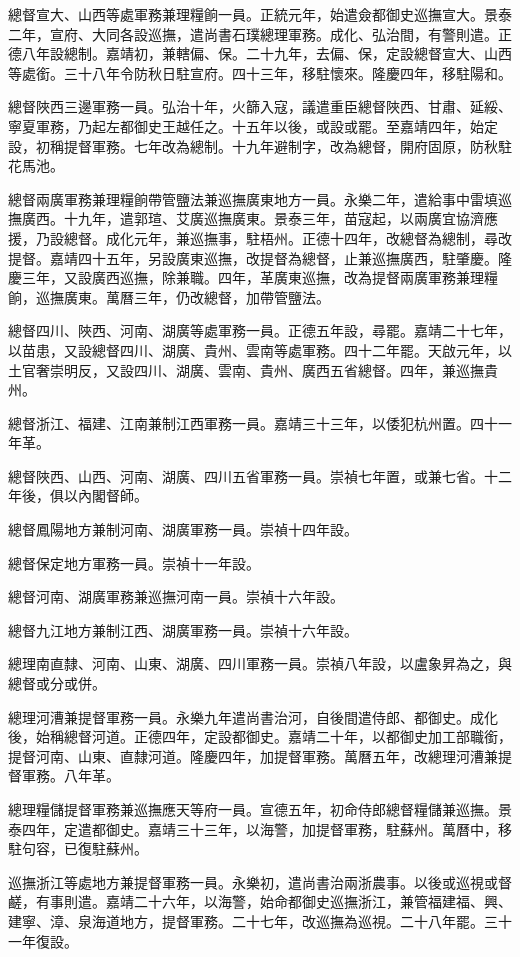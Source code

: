 總督宣大、山西等處軍務兼理糧餉一員。正統元年，始遣僉都御史巡撫宣大。景泰二年，宣府、大同各設巡撫，遣尚書石璞總理軍務。成化、弘治間，有警則遣。正德八年設總制。嘉靖初，兼轄偏、保。二十九年，去偏、保，定設總督宣大、山西等處銜。三十八年令防秋日駐宣府。四十三年，移駐懷來。隆慶四年，移駐陽和。

總督陜西三邊軍務一員。弘治十年，火篩入寇，議遣重臣總督陜西、甘肅、延綏、寧夏軍務，乃起左都御史王越任之。十五年以後，或設或罷。至嘉靖四年，始定設，初稱提督軍務。七年改為總制。十九年避制字，改為總督，開府固原，防秋駐花馬池。

總督兩廣軍務兼理糧餉帶管鹽法兼巡撫廣東地方一員。永樂二年，遣給事中雷填巡撫廣西。十九年，遣郭瑄、艾廣巡撫廣東。景泰三年，苗寇起，以兩廣宜協濟應援，乃設總督。成化元年，兼巡撫事，駐梧州。正德十四年，改總督為總制，尋改提督。嘉靖四十五年，另設廣東巡撫，改提督為總督，止兼巡撫廣西，駐肇慶。隆慶三年，又設廣西巡撫，除兼職。四年，革廣東巡撫，改為提督兩廣軍務兼理糧餉，巡撫廣東。萬曆三年，仍改總督，加帶管鹽法。

總督四川、陜西、河南、湖廣等處軍務一員。正德五年設，尋罷。嘉靖二十七年，以苗患，又設總督四川、湖廣、貴州、雲南等處軍務。四十二年罷。天啟元年，以土官奢崇明反，又設四川、湖廣、雲南、貴州、廣西五省總督。四年，兼巡撫貴州。

總督浙江、福建、江南兼制江西軍務一員。嘉靖三十三年，以倭犯杭州置。四十一年革。

總督陜西、山西、河南、湖廣、四川五省軍務一員。崇禎七年置，或兼七省。十二年後，俱以內閣督師。

總督鳳陽地方兼制河南、湖廣軍務一員。崇禎十四年設。

總督保定地方軍務一員。崇禎十一年設。

總督河南、湖廣軍務兼巡撫河南一員。崇禎十六年設。

總督九江地方兼制江西、湖廣軍務一員。崇禎十六年設。

總理南直隸、河南、山東、湖廣、四川軍務一員。崇禎八年設，以盧象昇為之，與總督或分或併。

總理河漕兼提督軍務一員。永樂九年遣尚書治河，自後間遣侍郎、都御史。成化後，始稱總督河道。正德四年，定設都御史。嘉靖二十年，以都御史加工部職銜，提督河南、山東、直隸河道。隆慶四年，加提督軍務。萬曆五年，改總理河漕兼提督軍務。八年革。

總理糧儲提督軍務兼巡撫應天等府一員。宣德五年，初命侍郎總督糧儲兼巡撫。景泰四年，定遣都御史。嘉靖三十三年，以海警，加提督軍務，駐蘇州。萬曆中，移駐句容，已復駐蘇州。

巡撫浙江等處地方兼提督軍務一員。永樂初，遣尚書治兩浙農事。以後或巡視或督鹺，有事則遣。嘉靖二十六年，以海警，始命都御史巡撫浙江，兼管福建福、興、建寧、漳、泉海道地方，提督軍務。二十七年，改巡撫為巡視。二十八年罷。三十一年復設。

